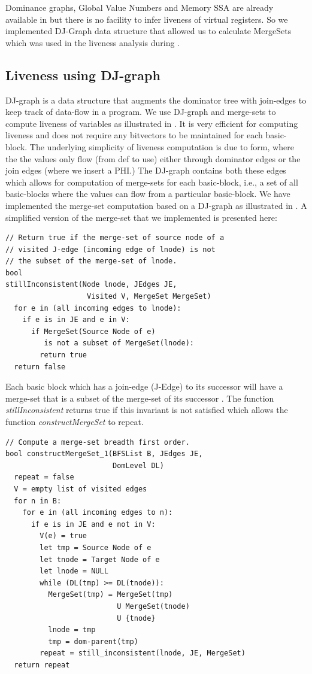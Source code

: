\documentclass[sigplan,10pt,review,anonymous]{acmart}\settopmatter{printfolios=true,printccs=false,printacmref=false}
\begin{document}
Dominance graphs, Global Value Numbers and Memory SSA are already available in
\LLVM{} but there is no facility to infer liveness of virtual registers. So we
implemented DJ-Graph data structure that allowed us to calculate MergeSets which
was used in the liveness analysis during \GCM{}.

\subsection{Liveness using DJ-graph}
DJ-graph \cite{Sreedhar1996} is a data structure that augments the dominator
tree with join-edges to keep track of data-flow in a program. We use DJ-graph
and merge-sets to compute liveness of variables as illustrated in
\cite{das2012}.  It is very efficient for computing liveness and does not
require any bitvectors to be maintained for each basic-block. The underlying
simplicity of liveness computation is due to \SSA{} form, where the the values
only flow (from def to use) either through dominator edges or the join edges
(where we insert a PHI.) The DJ-graph contains both these edges which allows for
computation of merge-sets for each basic-block, i.e., a set of all basic-blocks
where the values can flow from a particular basic-block. We have implemented the
merge-set computation based on a DJ-graph as illustrated in \cite{das2005}. A
simplified version of the merge-set that we implemented is presented here:

\begin{verbatim}
// Return true if the merge-set of source node of a
// visited J-edge (incoming edge of lnode) is not
// the subset of the merge-set of lnode.
bool
stillInconsistent(Node lnode, JEdges JE,
                   Visited V, MergeSet MergeSet)
  for e in (all incoming edges to lnode):
    if e is in JE and e in V:
      if MergeSet(Source Node of e)
         is not a subset of MergeSet(lnode):
        return true
  return false
\end{verbatim}

Each basic block which has a join-edge (J-Edge) to its successor will have a
merge-set that is a subset of the merge-set of its successor \cite{das2005}. The
function \emph{stillInconsistent} returns true if this invariant is not
satisfied which allows the function \emph{constructMergeSet} to repeat.

\begin{verbatim}
// Compute a merge-set breadth first order.
bool constructMergeSet_1(BFSList B, JEdges JE,
                         DomLevel DL)
  repeat = false
  V = empty list of visited edges
  for n in B:
    for e in (all incoming edges to n):
      if e is in JE and e not in V:
        V(e) = true
        let tmp = Source Node of e
        let tnode = Target Node of e
        let lnode = NULL
        while (DL(tmp) >= DL(tnode)):
          MergeSet(tmp) = MergeSet(tmp)
                          U MergeSet(tnode)
                          U {tnode}
          lnode = tmp
          tmp = dom-parent(tmp)
        repeat = still_inconsistent(lnode, JE, MergeSet)
  return repeat
\end{verbatim}
\end{document}
